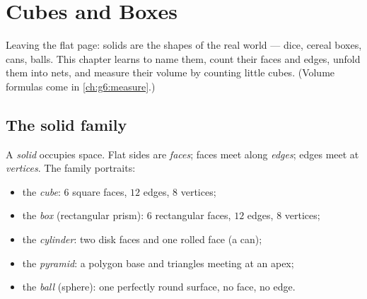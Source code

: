 \chapter{Cubes and Boxes}\label{ch:g5:solids}

Leaving the flat page: solids are the shapes of the real world ---
dice, cereal boxes, cans, balls. This chapter learns to name them,
count their faces and edges, unfold them into nets, and measure
their volume by counting little cubes. (Volume formulas come in
\cref{ch:g6:measure}.)

\section{The solid family}

\begin{definition}\label{def:g5:solids:def}
A \emph{solid} occupies space. Flat sides are \emph{faces}; faces
meet along \emph{edges}; edges meet at \emph{vertices}. The family
portraits:
\begin{itemize}
  \item the \emph{cube}: $6$ square faces, $12$ edges,
        $8$ vertices;
  \item the \emph{box} (rectangular prism): $6$
        rectangular faces, $12$ edges, $8$ vertices;
  \item the \emph{cylinder}: two disk faces and one rolled face
        (a can);
  \item the \emph{pyramid}: a polygon base and triangles meeting at
        an apex;
  \item the \emph{ball} (sphere): one perfectly round surface, no
        face, no edge.
\end{itemize}
\end{definition}

